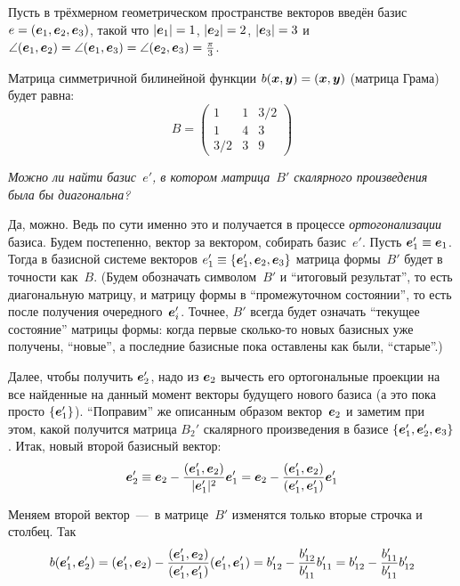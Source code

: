 \documentclass[a4paper,12pt]{article}
\begin{document}
  \begin{example}\label{ex:diag-scalar}
    Пусть в трёхмерном геометрическом пространстве векторов введён базис $e \hm= (\bds e_1, \bds e_2, \bds e_3)$, такой что $|\bds e_1| \hm= 1$, $|\bds e_2| \hm= 2$, $|\bds e_3| \hm= 3$ и $\angle(\bds e_1, \bds e_2) \hm= \angle(\bds e_1, \bds e_3) \hm= \angle(\bds e_2, \bds e_3) \hm= \frac{\pi}{3}$.
    
    Матрица симметричной билинейной функции $b(\bds x, \bds y) \hm= (\bds x, \bds y)$ (матрица Грама) будет равна:
    \[
      B = \begin{pmatrix}
        1   & 1 & 3/2\\
        1   & 4 & 3\\
        3/2 & 3 & 9
      \end{pmatrix}
    \]
    
    \emph{Можно ли найти базис~$e'$, в котором матрица~$B'$ скалярного произведения была бы диагональна?}
    
    Да, можно.
    Ведь по сути именно это и получается в процессе \emph{ортогонализации} базиса.
    Будем постепенно, вектор за вектором, собирать базис~$e'$.
    Пусть $\bds e_1' \hm\equiv \bds e_1$.
    Тогда в базисной системе векторов $e_1' \hm\equiv \{\bds e_1', \bds e_2, \bds e_3\}$ матрица формы~$B'$ будет в точности как~$B$.
    (Будем обозначать символом~$B'$ и ``итоговый результат'', то есть диагональную матрицу, и матрицу формы в ``промежуточном состоянии'', то есть после получения очередного~$\boldsymbol e_i'$.
    Точнее, $B'$ всегда будет означать ``текущее состояние'' матрицы формы: когда первые сколько-то новых базисных уже получены, ``новые'', а последние базисные пока оставлены как были, ``старые''.)
    
    Далее, чтобы получить $\boldsymbol e_2'$, надо из $\boldsymbol e_2$ вычесть его ортогональные проекции на все найденные на данный момент векторы будущего нового базиса (а это пока просто $\{\boldsymbol e_1'\}$).
    ``Поправим'' же описанным образом вектор~$\boldsymbol e_2$ и заметим при этом, какой получится матрица $B_2'$ скалярного произведения в базисе $\{\boldsymbol e_1', \boldsymbol e_2', \boldsymbol e_3\}$.
    Итак, новый второй базисный вектор:
    \[
      \boldsymbol e_2' \equiv \boldsymbol e_2 - \frac{(\boldsymbol e_1', \boldsymbol e_2)}{|\boldsymbol e_1'|^2} \boldsymbol e_1'
                     = \boldsymbol e_2 - \frac{(\boldsymbol e_1', \boldsymbol e_2)}{(\boldsymbol e_1', \boldsymbol e_1')} \boldsymbol e_1'
    \]
    
    Меняем второй вектор~---~в матрице~$B'$ изменятся только вторые строчка и столбец.
    Так
    \[
      b(\boldsymbol e_1', \boldsymbol e_2') = (\boldsymbol e_1', \boldsymbol e_2) - \frac{(\boldsymbol e_1', \boldsymbol e_2)}{(\boldsymbol e_1', \boldsymbol e_1')} (\boldsymbol e_1', \boldsymbol e_1')
        = b'_{12} - \frac{b'_{12}}{b'_{11}} b'_{11}
        = b'_{12} - \frac{b'_{11}}{b'_{11}} b'_{12}
    \]
    

\end{example}
\end{document}
